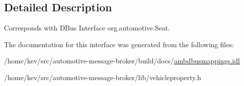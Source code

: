 \subsection{Detailed Description}
Corresponds with D\+Bus Interface org.\+automotive.\+Seat. 

The documentation for this interface was generated from the following files\+:\begin{DoxyCompactItemize}
\item 
/home/kev/src/automotive-\/message-\/broker/build/docs/\hyperlink{ambdbusmappings_8idl}{ambdbusmappings.\+idl}\item 
/home/kev/src/automotive-\/message-\/broker/lib/vehicleproperty.\+h\end{DoxyCompactItemize}
